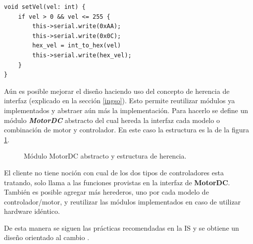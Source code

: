 \begin{lstlisting}[caption=Implementación método setVel para el motor que utiliza comunicación serie.,label={nuevaSetDir}]
void setVel(vel: int) {
    if vel > 0 && vel <= 255 {
        this->serial.write(0xAA);
        this->serial.write(0x0C);
        hex_vel = int_to_hex(vel)
        this->serial.write(hex_vel);
    }
}
\end{lstlisting}

Aún es posible mejorar el diseño haciendo uso del concepto de herencia de interfaz (explicado en la sección \ref{ingso}). Esto permite reutilizar módulos ya implementados y abstraer aún más la implementación. Para hacerlo se define un módulo \textbf{\textit{MotorDC}} abstracto del cual hereda la interfaz cada modelo o combinación de motor y controlador. En este caso la estructura es la de la figura \ref{estructuraHerencia}.

\begin{figure}[H]
\caption{Módulo MotorDC abstracto y estructura de herencia.}
\label{estructuraHerencia}
\begin{center}
\end{center}
\end{figure}

El cliente no tiene noción con cual de los dos tipos de controladores esta tratando, solo llama a las funciones provistas en la interfaz de \textbf{MotorDC}. También es posible agregar más herederos, uno por cada modelo de controlador/motor, y reutilizar las módulos implementados en caso de utilizar hardware idéntico. 

De esta manera se siguen las prácticas recomendadas en la IS \cite{ShawGarlan1996, ghezzi2003, bass2003, DBLP:books/daglib/0030743} y se obtiene un diseño orientado al cambio \cite{Gamma:1995:DPE:186897}.

